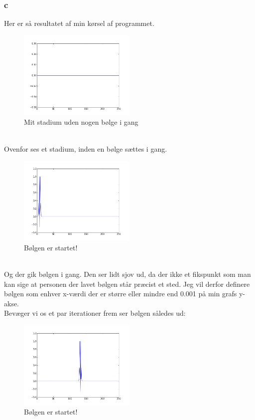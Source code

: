 \documentclass[11pt]{article} %
\begin{document}
\subsubsection*{c}
Her er så resultatet af min kørsel af programmet.\\
\begin{figure}[h!]
\centering
   \includegraphics[width=0.5\textwidth]{bild1}
  \caption{Mit stadium uden nogen bølge i gang}
\end{figure}
\\Ovenfor ses et stadium, inden en bølge sættes i gang.
\\
\begin{figure}[h!]
\centering
   \includegraphics[width=0.5\textwidth]{bild2}
  \caption{Bølgen er startet!}
\end{figure}\\
Og der gik bølgen i gang. Den ser lidt sjov ud, da der ikke et fikspunkt som man kan sige at personen der lavet bølgen står præcist et sted. Jeg vil derfor definere bølgen som enhver x-værdi der er større eller mindre end 0.001 på min grafs y-akse.\\
\newpage
Bevæger vi os et par iterationer frem ser bølgen således ud:
\begin{figure}[h!]
\centering
   \includegraphics[width=0.5\textwidth]{midvejs}
  \caption{Bølgen er startet!}
\end{figure}
\end{document}
